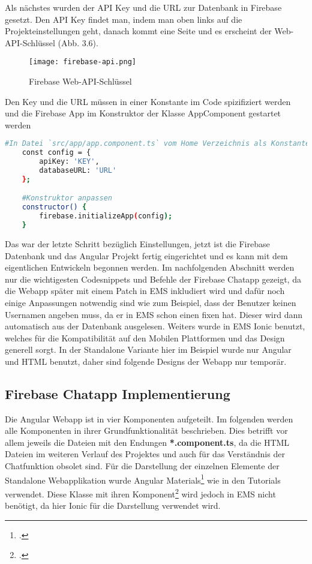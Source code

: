 Als nächstes wurden der API Key und die URL zur Datenbank in Firebase gesetzt. Den API Key findet man, indem man oben links auf die Projekteinstellungen geht, danach kommt eine Seite und es erscheint der Web-API-Schlüssel (Abb. 3.6).
\begin{center}
    \begin{figure}[H]
        \centering
        \texttt{[image: firebase-api.png]}
        \caption{Firebase Web-API-Schlüssel}
    \end{figure}
\end{center}
Den Key und die URL müssen in einer Konstante im Code spizifiziert werden und die Firebase App im Konstruktor der Klasse AppComponent gestartet werden
\begin{lstlisting}[language=bash]
    #In Datei `src/app/app.component.ts` vom Home Verzeichnis als Konstante zu definieren
    const config = {
        apiKey: 'KEY',
        databaseURL: 'URL'
    };

    #Konstruktor anpassen
    constructor() {
        firebase.initializeApp(config);
    }
\end{lstlisting}
Das war der letzte Schritt bezüglich Einstellungen, jetzt ist die Firebase Datenbank und das Angular Projekt fertig eingerichtet und es kann mit dem eigentlichen Entwickeln begonnen werden.
Im nachfolgenden Abschnitt werden nur die wichtigesten Codesnippets und Befehle der Firebase Chatapp gezeigt, da die Webapp später mit einem Patch in EMS inkludiert wird und dafür noch einige Anpassungen notwendig sind
wie zum Beispiel, dass der Benutzer keinen Usernamen angeben muss, da er in EMS schon einen fixen hat. Dieser wird dann automatisch aus der Datenbank ausgelesen. Weiters wurde in EMS Ionic benutzt, welches für die 
Kompatibilität auf den Mobilen Plattformen und das Design generell sorgt. In der Standalone Variante hier im Beispiel wurde nur Angular und HTML benutzt, daher sind folgende Designs der Webapp nur temporär.

\subsection{Firebase Chatapp Implementierung}
Die Angular Webapp ist in vier Komponenten aufgeteilt. Im folgenden werden alle Komponenten in ihrer Grundfunktionalität beschrieben. Dies betrifft vor allem jeweils die Dateien mit den Endungen \textbf{*.component.ts}, da die 
HTML Dateien im weiteren Verlauf des Projektes und auch für das Verständnis der Chatfunktion obsolet sind. Für die Darstellung der einzelnen Elemente der Standalone Webapplikation wurde Angular Materials\footcite{materials} wie in den Tutorials verwendet.
Diese Klasse mit ihren Komponent\footcite{matierials-componenten} wird jedoch in EMS nicht benötigt, da hier Ionic für die Darstellung verwendet wird.

